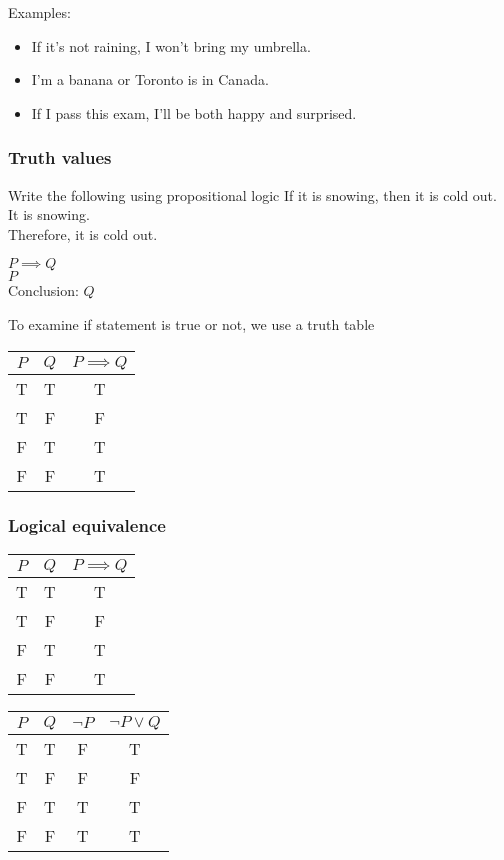 \documentclass{article}
\begin{document}
Examples:
\begin{itemize}
              \item If it's not raining, I won't bring my umbrella.
              \item I'm a banana or Toronto is in Canada.
              \item If I pass this exam, I'll be both happy and surprised.
\end{itemize}


\subsubsection{Truth values}

\begin{example} Write the following using propositional logic
If it is snowing, then it is cold out. \\
It is snowing. \\
Therefore, it is cold out.  
\end{example}

\begin{solution}
$P \implies Q$ \\
$P$ \\
Conclusion: $Q$ \\
\end{solution}


To examine if statement is true or not, we use a truth table


\begin{tabular}{|c|c| c|}
\hline
     $P$& $Q$ &  $P \implies Q$ \\ \hline
     T& T & T \\ \hline
     T & F & F \\ \hline
     F & T & T \\ \hline
     F & F & T \\ \hline
\end{tabular}



\subsubsection{Logical equivalence}

\begin{tabular}{|c|c| c|}
\hline
     $P$& $Q$ &  $P \implies Q$ \\ \hline
     T& T & T \\ \hline
     T & F & F \\ \hline
     F & T & T \\ \hline
     F & F & T \\ \hline
\end{tabular} \hspace{2cm} \begin{tabular}{|c | c | c | c|}
\hline
     $P$& $Q$ & $\neg P$ & $\neg P \vee Q$  \\ \hline
     T& T & F & T \\ \hline
     T & F & F & F \\ \hline
     F & T &  T &T \\ \hline
     F & F & T & T \\ \hline
\end{tabular}
\end{document}
